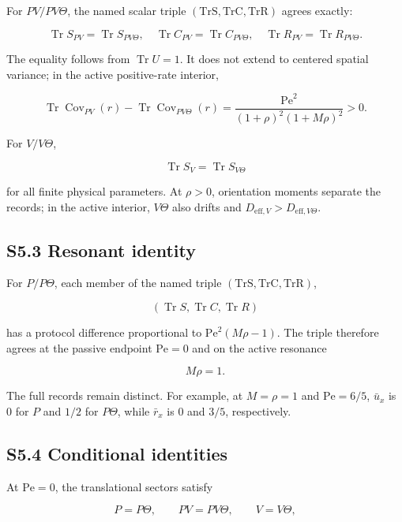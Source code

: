 For \(PV/PV\Theta\), the named scalar triple \((\mathrm{TrS},\mathrm{TrC},\mathrm{TrR})\) agrees exactly:

\[
\boxed{
\operatorname{Tr}S_{PV}=\operatorname{Tr}S_{PV\Theta},\quad
\operatorname{Tr}C_{PV}=\operatorname{Tr}C_{PV\Theta},\quad
\operatorname{Tr}R_{PV}=\operatorname{Tr}R_{PV\Theta}.
}
\]

The equality follows from \(\operatorname{Tr}U=1\). It does not extend to centered spatial variance; in the active positive-rate interior,

\[
\operatorname{Tr}\operatorname{Cov}_{PV}(r)
-\operatorname{Tr}\operatorname{Cov}_{PV\Theta}(r)
=\frac{\mathrm{Pe}^2}
{(1+\rho)^2(1+M\rho)^2}>0.
\]

For \(V/V\Theta\),

\[
\boxed{\operatorname{Tr}S_V=\operatorname{Tr}S_{V\Theta}}
\]

for all finite physical parameters. At \(\rho>0\), orientation moments separate the records; in the active interior, \(V\Theta\) also drifts and \(D_{\mathrm{eff},V}>D_{\mathrm{eff},V\Theta}\).

\subsection{S5.3 Resonant identity}\label{s5.3-resonant-identity}

For \(P/P\Theta\), each member of the named triple \((\mathrm{TrS},\mathrm{TrC},\mathrm{TrR})\),

\[
\boxed{(\operatorname{Tr}S,\operatorname{Tr}C,\operatorname{Tr}R)}
\]

has a protocol difference proportional to \(\mathrm{Pe}^2(M\rho-1)\). The triple therefore agrees at the passive endpoint \(\mathrm{Pe}=0\) and on the active resonance

\[
\boxed{M\rho=1.}
\]

The full records remain distinct. For example, at \(M=\rho=1\) and \(\mathrm{Pe}=6/5\), \(\bar u_x\) is \(0\) for \(P\) and \(1/2\) for \(P\Theta\), while \(\bar r_x\) is \(0\) and \(3/5\), respectively.

\subsection{S5.4 Conditional identities}\label{s5.4-conditional-identities}

At \(\mathrm{Pe}=0\), the translational sectors satisfy

\[
P=P\Theta,\qquad
PV=PV\Theta,\qquad
V=V\Theta,
\]

